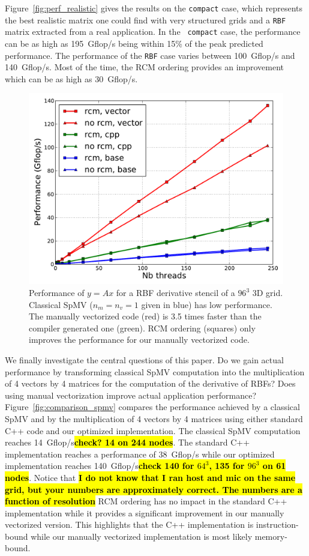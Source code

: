 \documentclass[10pt,conference,compsocconf]{IEEEtran}
\newcommand{\todo}[1]{{\color{red}\textbf{\hl{#1}}\xspace}}
\begin{document}
Figure~\ref{fig:perf_realistic} gives the results on the {\tt compact}
case, which represents the best realistic matrix one could find with very
structured grids and a
{\tt RBF} matrix extracted from a real application. In the {\tt
  compact} case, the performance can be as high as 195~Gflop/s being
within 15\% of the peak predicted performance. The performance of the
{\tt RBF} case varies between 100~Gflop/s and 140~Gflop/s. Most of the
time, the RCM ordering provides an improvement which can be as high as
30~Gflop/s.

\begin{figure}
  \centering 
  
  \includegraphics[width=.9\linewidth]{figures/mic_performance_nb_threads.pdf}

  \caption{Performance of $y=Ax$ for a RBF derivative stencil of a
    $96^3$ 3D grid. Classical SpMV ($n_m=n_v=1$ given in blue) has low
    performance. The manually vectorized code (red) is 3.5 times
    faster than the compiler generated one (green). RCM ordering
    (squares) only improves the performance for our manually
    vectorized code.}
  \label{fig:comparison_spmv}
  \label{fig:perf_mic}
\end{figure}

We finally investigate the central questions of this paper. Do we gain
actual performance by transforming classical SpMV computation into the
multiplication of 4 vectors by 4 matrices for the computation of the
derivative of RBFs? Does using manual vectorization improve actual
application performance? Figure~\ref{fig:comparison_spmv} compares the
performance achieved by a classical SpMV and by the multiplication of
4 vectors by 4 matrices using either standard C++ code and our
optimized implementation. The
classical SpMV computation reaches 14~Gflop/s\todo{check? 14 on 244 nodes}. 
The standard C++ implementation reaches a performance of 38~Gflop/s while our
optimized implementation reaches 140~Gflop/s\todo{check 140 for $64^3$, 135 for $96^3$ on 61 nodes}. 
Notice that \todo{I do not know that I ran host and mic on the same grid, but your 
numbers are approximately correct. The numbers are a function of resolution} 
RCM ordering has no impact in the standard C++ implementation while it
provides a significant improvement in our manually vectorized
version. This highlights that the C++ implementation is instruction-bound
while our manually vectorized implementation is most likely 
memory-bound. 
\end{document}
